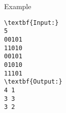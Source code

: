 Example
\begin{verbatim}
\textbf{Input:}
5
00101
11010
00101
01010
11101
\textbf{Output:}
4 1
3 3
3 2\end{verbatim}